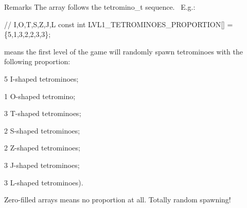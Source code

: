 \begin{DoxyRemark}{Remarks}
The array follows the tetromino\+\_\+t sequence.~\newline
E.\+g.\+:
\begin{DoxyCode}
\textcolor{comment}{//                                        I,O,T,S,Z,J,L}
\textcolor{keyword}{const} \textcolor{keywordtype}{int} LVL1\_TETROMINOES\_PROPORTION[] = \{5,1,3,2,2,3,3\};
\end{DoxyCode}
 means the first level of the game will randomly spawn tetrominoes with the following proportion\+:
\begin{DoxyItemize}
\item 5 I-\/shaped tetrominoes;
\item 1 O-\/shaped tetromino;
\item 3 T-\/shaped tetrominoes;
\item 2 S-\/shaped tetrominoes;
\item 2 Z-\/shaped tetrominoes;
\item 3 J-\/shaped tetrominoes;
\item 3 L-\/shaped tetrominoes).
\end{DoxyItemize}

Zero-\/filled arrays means no proportion at all. Totally random spawning! 
\end{DoxyRemark}
